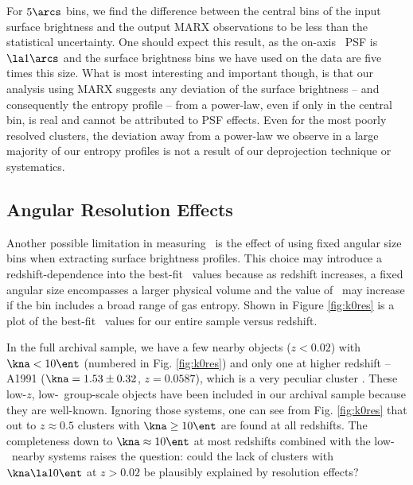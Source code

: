 \documentclass{emulateapj}
\begin{document}
For $5\arcs$ bins, we find the difference between the central bins of
the input surface brightness and the output MARX observations to be
less than the statistical uncertainty. One should expect this result,
as the on-axis \chandra\ PSF is $\la 1\arcs$ and the surface
brightness bins we have used on the data are five times this
size. What is most interesting and important though, is that our
analysis using MARX suggests any deviation of the surface brightness
-- and consequently the entropy profile -- from a power-law, even if
only in the central bin, is real and cannot be attributed to PSF
effects. Even for the most poorly resolved clusters, the deviation
away from a power-law we observe in a large majority of our entropy
profiles is not a result of our deprojection technique or systematics.

\subsection{Angular Resolution Effects}
\label{sec:angres}

Another possible limitation in measuring \kna\ is the effect of using
fixed angular size bins when extracting surface brightness
profiles. This choice may introduce a redshift-dependence into the
best-fit \kna\ values because as redshift increases, a fixed angular
size encompasses a larger physical volume and the value of \kna\ may
increase if the bin includes a broad range of gas entropy. Shown in
Figure \ref{fig:k0res} is a plot of the best-fit \kna\ values for our
entire sample versus redshift.

In the full archival sample, we have a few nearby objects ($z < 0.02$)
with $\kna < 10 \ent$ (numbered in Fig. \ref{fig:k0res}) and only one
at higher redshift -- A1991 ($\kna = 1.53 \pm 0.32$, $z = 0.0587$),
which is a very peculiar cluster \citep{2004ApJ...613..180S}. These
low-$z$, low-\kna\ group-scale objects have been included in our
archival sample because they are well-known. Ignoring those systems,
one can see from Fig. \ref{fig:k0res} that out to $z \approx 0.5$
clusters with $\kna \geq 10 \ent$ are found at all redshifts. The
completeness down to $\kna \approx 10 \ent$ at most redshifts combined
with the low-\kna\ nearby systems raises the question: could the lack
of clusters with $\kna \la 10 \ent$ at $z > 0.02$ be plausibly
explained by resolution effects?
\end{document}
